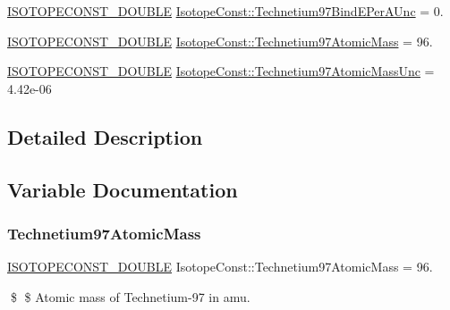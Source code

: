 \begin{DoxyCompactItemize}
\mbox{\hyperlink{group___isotope_const-_macros_ga8f45a7272ce02c0b4c65c44636ed719a}{I\+S\+O\+T\+O\+P\+E\+C\+O\+N\+S\+T\+\_\+\+D\+O\+U\+B\+LE}} \mbox{\hyperlink{group___isotope_const-_technetium-_tc97_ga9c1c401549ca933a95156206c5422714}{Isotope\+Const\+::\+Technetium97\+Bind\+E\+Per\+A\+Unc}} = 0.
\item 
\mbox{\hyperlink{group___isotope_const-_macros_ga8f45a7272ce02c0b4c65c44636ed719a}{I\+S\+O\+T\+O\+P\+E\+C\+O\+N\+S\+T\+\_\+\+D\+O\+U\+B\+LE}} \mbox{\hyperlink{group___isotope_const-_technetium-_tc97_ga38131a3d9b005fd2cda9a8b691caa58e}{Isotope\+Const\+::\+Technetium97\+Atomic\+Mass}} = 96.
\item 
\mbox{\hyperlink{group___isotope_const-_macros_ga8f45a7272ce02c0b4c65c44636ed719a}{I\+S\+O\+T\+O\+P\+E\+C\+O\+N\+S\+T\+\_\+\+D\+O\+U\+B\+LE}} \mbox{\hyperlink{group___isotope_const-_technetium-_tc97_ga785bb538c9d9747b465b934d3d6fb41a}{Isotope\+Const\+::\+Technetium97\+Atomic\+Mass\+Unc}} = 4.\+42e-\/06
\end{DoxyCompactItemize}


\subsection{Detailed Description}


\subsection{Variable Documentation}
\mbox{\label{group___isotope_const-_technetium-_tc97_ga38131a3d9b005fd2cda9a8b691caa58e}} 
\subsubsection{\texorpdfstring{Technetium97\+Atomic\+Mass}{Technetium97AtomicMass}}
{\footnotesize\ttfamily \mbox{\hyperlink{group___isotope_const-_macros_ga8f45a7272ce02c0b4c65c44636ed719a}{I\+S\+O\+T\+O\+P\+E\+C\+O\+N\+S\+T\+\_\+\+D\+O\+U\+B\+LE}} Isotope\+Const\+::\+Technetium97\+Atomic\+Mass = 96.}

\$ \$ Atomic mass of Technetium-\/97 in amu. \mbox{\label{group___isotope_const-_technetium-_tc97_ga785bb538c9d9747b465b934d3d6fb41a}} 
